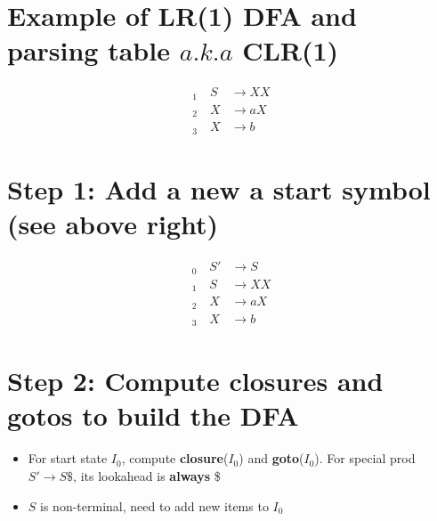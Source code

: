 \documentclass[10pt,a4paper,landscape]{article}
\begin{document}
\pagestyle{empty}
\begin{multicols*}{3}
% 
% 

\section*{Example of LR(1) DFA and parsing table $a.k.a$ CLR(1)}
\begin{align*}
  _1\quad S&\to XX \\
  _2\quad X&\to aX \\
  _3\quad X&\to b
\end{align*}
\section*{Step 1: Add a new a start symbol (see above right)}
\begin{align*}
  _0\quad S'&\to S \\
  _1\quad S&\to XX \\
  _2\quad X&\to aX \\
  _3\quad X&\to b
\end{align*}
\section*{Step 2: Compute closures and gotos to build the DFA}
\begin{itemize}
\item For start state $I_0$, compute \textbf{closure}($I_0$) and \textbf{goto}($I_0$). For special prod $S'\to S\$$, its lookahead is \textbf{always} \$
\begin{minipage}{\linewidth}
  \centering
\end{minipage}
\item $S$ is non-terminal, need to add new items to $I_0$



\end{itemize}
\end{multicols*}
\end{document}
